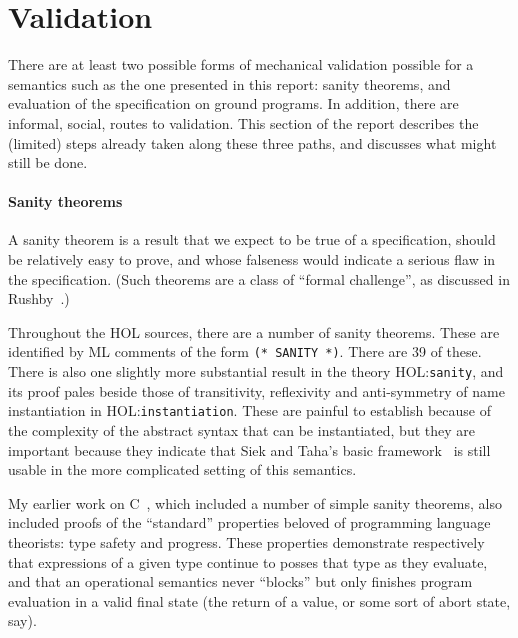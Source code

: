\documentclass[11pt]{article}
\newcommand{\HOLfile}[1]{HOL:\texttt{#1}}
\begin{document}




\section{Validation}
\label{sec:validation}

There are at least two possible forms of mechanical validation
possible for a semantics such as the one presented in this report:
sanity theorems, and evaluation of the specification on ground
programs.  In addition, there are informal, social, routes to
validation.  This section of the report describes the (limited) steps
already taken along these three paths, and discusses what might still
be done.

\paragraph{Sanity theorems}
 A sanity theorem is a result that we expect to
be true of a specification, should be relatively easy to prove, and
whose falseness would indicate a serious flaw in the specification.
(Such theorems are a class of ``formal challenge'', as discussed in
Rushby~\cite{Rushby93}.)

Throughout the HOL sources, there are a number of sanity theorems.
These are identified by ML comments of the form \texttt{(*~SANITY~*)}.
There are 39 of these.  There is also one slightly more substantial
result in the theory \HOLfile{sanity}, and its proof pales beside
those of transitivity, reflexivity and anti-symmetry of name
instantiation in \HOLfile{instantiation}.  These are painful to
establish because of the complexity of the abstract syntax that can be
instantiated, but they are important because they indicate that Siek
and Taha's basic framework~\cite{DBLP:conf/ecoop/SiekT06} is still
usable in the more complicated setting of this \cpp{} semantics.

My earlier work on C~\cite{Norrish98}, which included a number of
simple sanity theorems, also included proofs of the ``standard''
properties beloved of programming language theorists: type safety and
progress.  These properties demonstrate respectively that expressions
of a given type continue to posses that type as they evaluate, and
that an operational semantics never ``blocks'' but only finishes
program evaluation in a valid final state (the return of a value, or
some sort of abort state, say).
\end{document}

